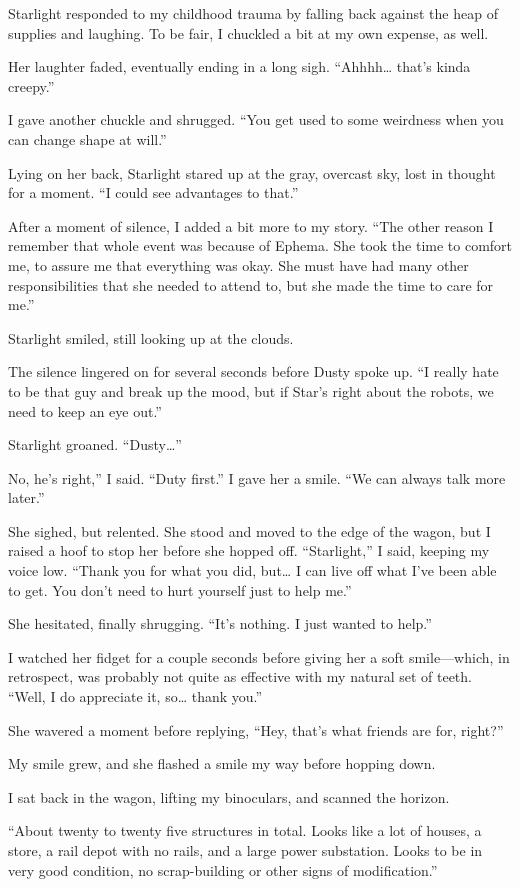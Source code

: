 Starlight responded to my childhood trauma by falling back against the heap of supplies and laughing. To be fair, I chuckled a bit at my own expense, as well.

Her laughter faded, eventually ending in a long sigh. “Ahhhh… that’s kinda creepy.”

I gave another chuckle and shrugged. “You get used to some weirdness when you can change shape at will.”

Lying on her back, Starlight stared up at the gray, overcast sky, lost in thought for a moment. “I could see advantages to that.”

After a moment of silence, I added a bit more to my story. “The other reason I remember that whole event was because of Ephema. She took the time to comfort me, to assure me that everything was okay. She must have had many other responsibilities that she needed to attend to, but she made the time to care for me.”

Starlight smiled, still looking up at the clouds.

The silence lingered on for several seconds before Dusty spoke up. “I really hate to be that guy and break up the mood, but if Star’s right about the robots, we need to keep an eye out.”

Starlight groaned. “Dusty…”

\leavevmode{}No, he’s right,” I said. “Duty first.” I gave her a smile. “We can always talk more later.”

She sighed, but relented. She stood and moved to the edge of the wagon, but I raised a hoof to stop her before she hopped off. “Starlight,” I said, keeping my voice low. “Thank you for what you did, but… I can live off what I’ve been able to get. You don’t need to hurt yourself just to help me.”

She hesitated, finally shrugging. “It’s nothing. I just wanted to help.”

I watched her fidget for a couple seconds before giving her a soft smile—which, in retrospect, was probably not quite as effective with my natural set of teeth. “Well, I do appreciate it, so… thank you.”

She wavered a moment before replying, “Hey, that’s what friends are for, right?”

My smile grew, and she flashed a smile my way before hopping down.

I sat back in the wagon, lifting my binoculars, and scanned the horizon.

{\br}%
“About twenty to twenty five structures in total. Looks like a lot of houses, a store, a rail depot with no rails, and a large power substation. Looks to be in very good condition, no scrap-building or other signs of modification.”


